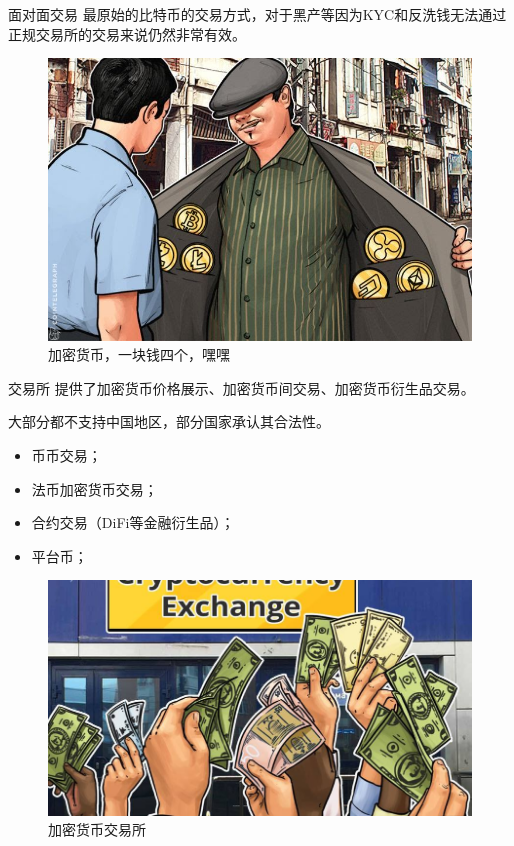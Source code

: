 \documentclass[11pt]{beamer}
\begin{document}
\begin{frame}{面对面交易}
	最原始的比特币的交易方式，对于黑产等因为KYC和反洗钱无法通过正规交易所的交易来说仍然非常有效。
	\begin{figure}
		\centering
		\includegraphics[width=0.6\linewidth]{figures/btcFaceToFace}
		\caption{加密货币，一块钱四个，嘿嘿}
		\label{fig:btcfacetoface}
	\end{figure}

\end{frame}

\begin{frame}{交易所}
	提供了加密货币价格展示、加密货币间交易、加密货币衍生品交易。

	大部分都不支持中国地区，部分国家承认其合法性。
	\begin{itemize}
		\item 币币交易；
		\item 法币加密货币交易；
		\item 合约交易（DiFi等金融衍生品）；
		\item 平台币；
	\end{itemize}

	\begin{figure}
		\centering
		\includegraphics[width=0.6\linewidth,height=0.4\textheight]{figures/exchange}
		\caption{加密货币交易所}
		\label{fig:exchange}
	\end{figure}

\end{frame}
\end{document}
